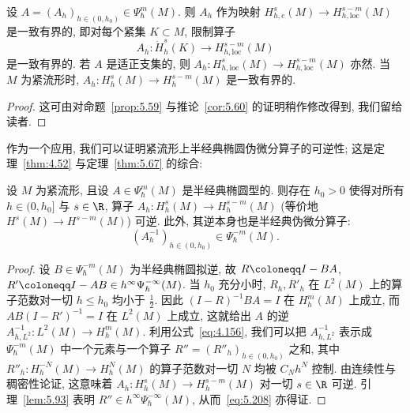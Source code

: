 \begin{proposition}[半经典伪微分算子的有界性]\label{prop:5.91}
设 $A = (A_h)_{h \in (0, h_0)} \in \Psi_\hbar^m(M)$. 则 $A_h$ 作为映射 $H_{h,\mathrm{c}}^s(M) \to H_{h,\mathrm{loc}}^{s-m}(M)$ 是一致有界的, 即对每个紧集 $K \subset M$, 限制算子
\begin{equation}\label{eq:5.207}
    A_h \colon \dot{H}_h^s(K) \to H_{h,\mathrm{loc}}^{s-m}(M)
\end{equation}
是一致有界的. 若 $A$ 是适正支集的, 则 $A_h \colon H_{h,\mathrm{loc}}^s(M) \to H_{h,\mathrm{loc}}^{s-m}(M)$ 亦然. 当 $M$ 为紧流形时, $A_h \colon H_h^s(M) \to H_h^{s-m}(M)$ 是一致有界的.
\end{proposition}

\begin{proof}
这可由对命题~\ref{prop:5.59} 与推论~\ref{cor:5.60} 的证明稍作修改得到, 我们留给读者.
\end{proof}

作为一个应用, 我们可以证明紧流形上半经典椭圆伪微分算子的可逆性; 这是定理~\ref{thm:4.52} 与定理~\ref{thm:5.67} 的综合:

\begin{theorem}[椭圆半经典伪微分算子的可逆性]\label{thm:5.92}
设 $M$ 为紧流形, 且设 $A \in \Psi_\hbar^m(M)$ 是半经典椭圆型的. 则存在 $h_0 > 0$ 使得对所有 $h \in (0, h_0]$ 与 $s \in \R$, 算子 $A_h \colon H_h^s(M) \to H_h^{s-m}(M)$ (等价地 $H^s(M) \to H^{s-m}(M)$) 可逆. 此外, 其逆本身也是半经典伪微分算子:
\begin{equation}\label{eq:5.208}
    (A_h^{-1})_{h \in (0, h_0)} \in \Psi_\hbar^{-m}(M).
\end{equation}
\end{theorem}

\begin{proof}
设 $B \in \Psi_\hbar^{-m}(M)$ 为半经典椭圆拟逆, 故 $R \defeq I - B A$, $R' \defeq I - A B \in h^\infty \Psi_\hbar^{-\infty}(M)$. 当 $h_0$ 充分小时, $R_h, R'_h$ 在 $L^2(M)$ 上的算子范数对一切 $h \le h_0$ 均小于 $\frac{1}{2}$. 因此 $(I - R)^{-1} B A = I$ 在 $H_h^m(M)$ 上成立, 而 $A B (I - R')^{-1} = I$ 在 $L^2(M)$ 上成立, 这就给出 $A$ 的逆 $A_{h, L^2}^{-1} \colon L^2(M) \to H_h^m(M)$. 利用公式~\eqref{eq:4.156}, 我们可以把 $A_{h, L^2}^{-1}$ 表示成 $\Psi_\hbar^{-m}(M)$ 中一个元素与一个算子 $R'' = (R''_h)_{h \in (0, h_0)}$ 之和, 其中 $R''_h \colon H_h^{-N}(M) \to H_h^N(M)$ 的算子范数对一切 $N$ 均被 $C_N h^N$ 控制. 由连续性与稠密性论证, 这意味着 $A_h \colon H_h^s(M) \to H_h^{s-m}(M)$ 对一切 $s \in \R$ 可逆. 引理~\ref{lem:5.93} 表明 $R'' \in h^\infty \Psi_\hbar^{-\infty}(M)$, 从而~\eqref{eq:5.208} 亦得证.
\end{proof}

